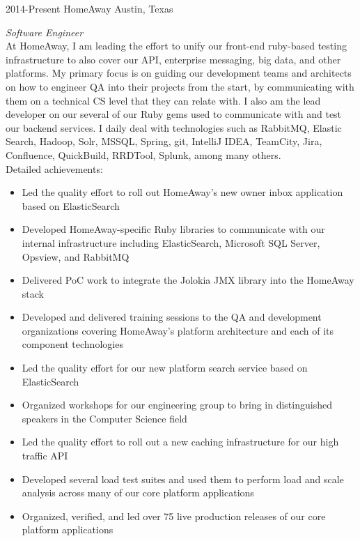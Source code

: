 \documentclass{friggeri-cv} %
\begin{document}
\begin{entrylist}
\entry
{2014-Present}
{HomeAway}
{Austin, Texas}
{\emph{Software Engineer} \\
At HomeAway, I am leading the effort to unify our front-end ruby-based testing infrastructure to also cover our API, enterprise messaging, big data, and other platforms. My primary focus is on guiding our development teams and architects on how to engineer QA into their projects from the start, by communicating with them on a technical CS level that they can relate with. I also am the lead developer on our several of our Ruby gems used to communicate with and test our backend services. I daily deal with technologies such as RabbitMQ, Elastic Search, Hadoop, Solr, MSSQL, Spring, git, IntelliJ IDEA, TeamCity, Jira, Confluence, QuickBuild, RRDTool, Splunk, among many others. \\
Detailed achievements:
\begin{itemize}
\item Led the quality effort to roll out HomeAway's new owner inbox application based on ElasticSearch
\item Developed HomeAway-specific Ruby libraries to communicate with our internal infrastructure including ElasticSearch, Microsoft SQL Server, Opsview, and RabbitMQ
\item Delivered PoC work to integrate the Jolokia JMX library into the HomeAway stack
\item Developed and delivered training sessions to the QA and development organizations covering HomeAway's platform architecture and each of its component technologies
\item Led the quality effort for our new platform search service based on ElasticSearch
\item Organized workshops for our engineering group to bring in distinguished speakers in the Computer Science field
\item Led the quality effort to roll out a new caching infrastructure for our high traffic API
\item Developed several load test suites and used them to perform load and scale analysis across many of our core platform applications
\item Organized, verified, and led over 75 live production releases of our core platform applications
\end{itemize}}
\end{entrylist}
\end{document}
